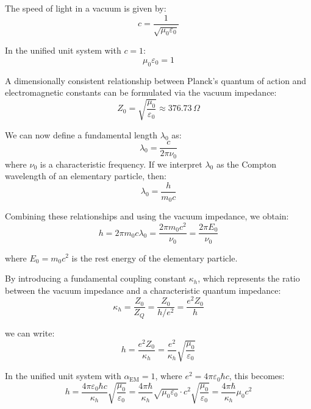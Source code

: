 \documentclass[12pt,a4paper]{article}
\newcommand{\alphaEM}{\alpha_{\text{EM}}}
\begin{document}
	The speed of light in a vacuum is given by:
	\begin{equation}
		\label{eq:speed_of_light}
		c = \frac{1}{\sqrt{\mu_0 \varepsilon_0}}
	\end{equation}
	
	In the unified unit system with \(c = 1\):
	\begin{equation}
		\label{eq:mu_epsilon}
		\mu_0 \varepsilon_0 = 1
	\end{equation}
	
	A dimensionally consistent relationship between Planck's quantum of action and electromagnetic constants can be formulated via the vacuum impedance:
	\begin{equation}
		\label{eq:vacuum_impedance}
		Z_0 = \sqrt{\frac{\mu_0}{\varepsilon_0}} \approx 376.73 \, \Omega
	\end{equation}
	
	We can now define a fundamental length \(\lambda_0\) as:
	\begin{equation}
		\lambda_0 = \frac{c}{2\pi \nu_0}
	\end{equation}
	where \(\nu_0\) is a characteristic frequency. If we interpret \(\lambda_0\) as the Compton wavelength of an elementary particle, then:
	\begin{equation}
		\lambda_0 = \frac{h}{m_0 c}
	\end{equation}
	
	Combining these relationships and using the vacuum impedance, we obtain:
	\begin{equation}
		h = 2\pi m_0 c \lambda_0 = \frac{2\pi m_0 c^2}{\nu_0} = \frac{2\pi E_0}{\nu_0}
	\end{equation}
	
	where \(E_0 = m_0 c^2\) is the rest energy of the elementary particle.
	
	By introducing a fundamental coupling constant \(\kappa_h\), which represents the ratio between the vacuum impedance and a characteristic quantum impedance:
	\begin{equation}
		\kappa_h = \frac{Z_0}{Z_Q} = \frac{Z_0}{h/e^2} = \frac{e^2 Z_0}{h}
	\end{equation}
	
	we can write:
	\begin{equation}
		h = \frac{e^2 Z_0}{\kappa_h} = \frac{e^2}{\kappa_h} \sqrt{\frac{\mu_0}{\varepsilon_0}}
	\end{equation}
	
	In the unified unit system with \(\alphaEM = 1\), where \(e^2 = 4\pi\varepsilon_0\hbar c\), this becomes:
	\begin{equation}
		h = \frac{4\pi\varepsilon_0\hbar c}{\kappa_h} \sqrt{\frac{\mu_0}{\varepsilon_0}} = \frac{4\pi\hbar}{\kappa_h} \sqrt{\mu_0\varepsilon_0} \cdot c^2 \sqrt{\frac{\mu_0}{\varepsilon_0}} = \frac{4\pi\hbar}{\kappa_h} \mu_0 c^2
	\end{equation}
	
\end{document}

